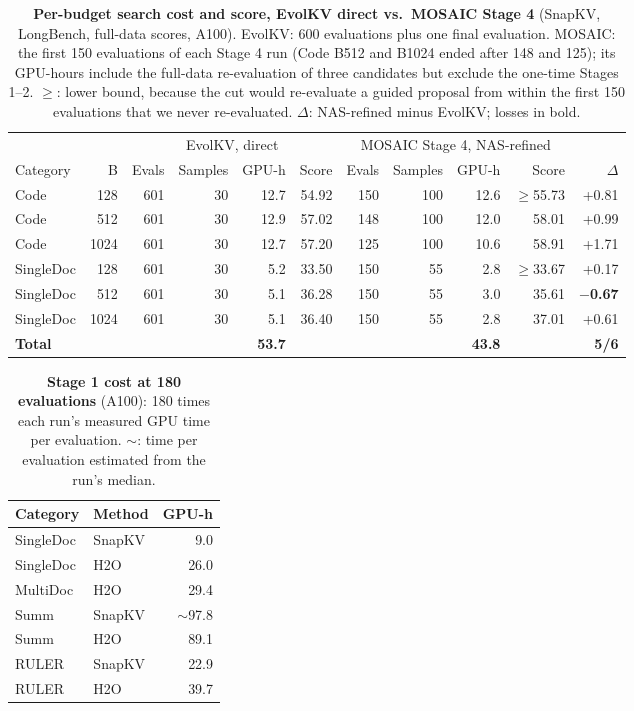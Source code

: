 \begin{table}[t]
  \centering
  \footnotesize
  \setlength{\tabcolsep}{4pt}
  \begin{tabular}{@{}l r r r r r r r r r r@{}}
    \toprule
    & & \multicolumn{4}{c}{EvolKV, direct} & \multicolumn{4}{c}{MOSAIC Stage 4, NAS-refined} & \\ \cmidrule(lr){3-6}\cmidrule(lr){7-10}
    Category & B & Evals & Samples & GPU-h & Score & Evals & Samples & GPU-h & Score & $\Delta$ \\
    \midrule
    Code & 128 & 601 & 30 & 12.7 & 54.92 & 150 & 100 & 12.6 & $\geq$55.73 & +0.81 \\
    Code & 512 & 601 & 30 & 12.9 & 57.02 & 148 & 100 & 12.0 & 58.01 & +0.99 \\
    Code & 1024 & 601 & 30 & 12.7 & 57.20 & 125 & 100 & 10.6 & 58.91 & +1.71 \\
    SingleDoc & 128 & 601 & 30 & 5.2 & 33.50 & 150 & 55 & 2.8 & $\geq$33.67 & +0.17 \\
    SingleDoc & 512 & 601 & 30 & 5.1 & 36.28 & 150 & 55 & 3.0 & 35.61 & \textbf{$-$0.67} \\
    SingleDoc & 1024 & 601 & 30 & 5.1 & 36.40 & 150 & 55 & 2.8 & 37.01 & +0.61 \\
    \textbf{Total} &  &  &  & \textbf{53.7} &  &  &  & \textbf{43.8} &  & \textbf{5/6} \\
    \bottomrule
  \end{tabular}
  \caption{\textbf{Per-budget search cost and score, EvolKV direct vs.\ MOSAIC Stage 4} (SnapKV, LongBench, full-data scores, A100). EvolKV: 600 evaluations plus one final evaluation. MOSAIC: the first 150 evaluations of each Stage 4 run (Code B512 and B1024 ended after 148 and 125); its GPU-hours include the full-data re-evaluation of three candidates but exclude the one-time Stages 1--2. $\geq$: lower bound, because the cut would re-evaluate a guided proposal from within the first 150 evaluations that we never re-evaluated. $\Delta$: NAS-refined minus EvolKV; losses in bold.}
  \label{tab:app-cost}
\end{table}

\begin{table}[t]
  \centering
  \footnotesize
  \setlength{\tabcolsep}{4pt}
  \begin{tabular}{@{}l l r@{}}
    \toprule
    Category & Method & GPU-h \\
    \midrule
    SingleDoc & SnapKV & 9.0 \\
    SingleDoc & H2O & 26.0 \\
    MultiDoc & H2O & 29.4 \\
    Summ & SnapKV & $\sim$97.8 \\
    Summ & H2O & 89.1 \\
    RULER & SnapKV & 22.9 \\
    RULER & H2O & 39.7 \\
    \bottomrule
  \end{tabular}
  \caption{\textbf{Stage 1 cost at 180 evaluations} (A100): 180 times each run's measured GPU time per evaluation. $\sim$: time per evaluation estimated from the run's median.}
  \label{tab:app-step1}
\end{table}


